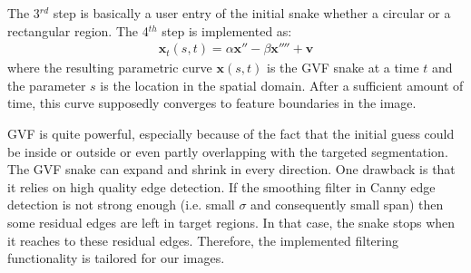 \documentclass{article}
\begin{document}
The 3$^{rd}$ step is basically a user entry of the initial snake whether a circular or a rectangular region. The 4$^{th}$ step is implemented as:
\begin{align*}
\mathbf{x}_t(s,t) = \alpha \mathbf{x}'' - \beta \mathbf{x}'''' + \mathbf{v}
\end{align*}
where the resulting parametric curve $\mathbf{x}(s,t)$ is the GVF snake at a time $t$ and the parameter $s$ is the location in the spatial domain. After a sufficient amount of time, this curve supposedly converges to feature boundaries in the image.

GVF is quite powerful, especially because of the fact that the initial guess could be inside or outside or even partly overlapping with the targeted segmentation. The GVF snake can expand and shrink in every direction. One drawback is that it relies on high quality edge detection. If the smoothing filter in Canny edge detection is not strong enough (i.e. small $\sigma$ and consequently small span) then some residual edges are left in target regions. In that case, the snake stops when it reaches to these residual edges. Therefore, the implemented filtering functionality is tailored for our images.
\end{document}
